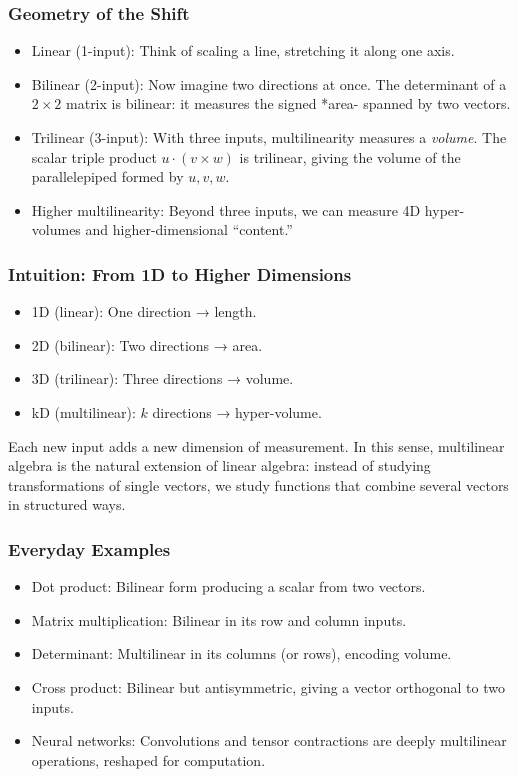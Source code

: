\documentclass[
  letterpaper,
  DIV=11,
  numbers=noendperiod]{scrreprt}
\providecommand{\tightlist}{%
  \setlength{\itemsep}{0pt}\setlength{\parskip}{0pt}}
\begin{document}
\subsubsection{Geometry of the Shift}\label{geometry-of-the-shift}

\begin{itemize}
\tightlist
\item
  Linear (1-input): Think of scaling a line, stretching it along one
  axis.
\item
  Bilinear (2-input): Now imagine two directions at once. The
  determinant of a \(2 \times 2\) matrix is bilinear: it measures the
  signed *area- spanned by two vectors.
\item
  Trilinear (3-input): With three inputs, multilinearity measures a
  \emph{volume}. The scalar triple product \(u \cdot (v \times w)\) is
  trilinear, giving the volume of the parallelepiped formed by
  \(u, v, w\).
\item
  Higher multilinearity: Beyond three inputs, we can measure 4D
  hyper-volumes and higher-dimensional ``content.''
\end{itemize}

\subsubsection{Intuition: From 1D to Higher
Dimensions}\label{intuition-from-1d-to-higher-dimensions}

\begin{itemize}
\tightlist
\item
  1D (linear): One direction → length.
\item
  2D (bilinear): Two directions → area.
\item
  3D (trilinear): Three directions → volume.
\item
  kD (multilinear): \(k\) directions → hyper-volume.
\end{itemize}

Each new input adds a new dimension of measurement. In this sense,
multilinear algebra is the natural extension of linear algebra: instead
of studying transformations of single vectors, we study functions that
combine several vectors in structured ways.

\subsubsection{Everyday Examples}\label{everyday-examples}

\begin{itemize}
\tightlist
\item
  Dot product: Bilinear form producing a scalar from two vectors.
\item
  Matrix multiplication: Bilinear in its row and column inputs.
\item
  Determinant: Multilinear in its columns (or rows), encoding volume.
\item
  Cross product: Bilinear but antisymmetric, giving a vector orthogonal
  to two inputs.
\item
  Neural networks: Convolutions and tensor contractions are deeply
  multilinear operations, reshaped for computation.
\end{itemize}
\end{document}
